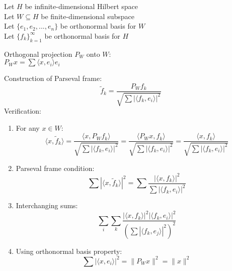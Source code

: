 \documentclass{article}
\begin{document}
Let $H$ be infinite-dimensional Hilbert space\\
Let $W \subseteq H$ be finite-dimensional subspace\\
Let $\{e_1, e_2, ..., e_n \}$ be orthonormal basis for $W$\\
Let $\{f_k \}_{k = 1}^{\infty}$ be orthonormal basis for $H$

Orthogonal projection $P_W$ onto $W$:\\
$P_W x = \sum \langle x, e_i \rangle e_i$

Construction of Parseval frame:
\begin{equation}
  \tilde{f}_k = \frac{P_W f_k}{\sqrt{\sum | \langle f_k, e_i \rangle |^2}}
\end{equation}
Verification:
\begin{enumerate}
  \item For any $x \in W$:
  \begin{equation}
    \langle x, \tilde{f}_k \rangle = \frac{\langle x, P_W f_k
    \rangle}{\sqrt{\sum | \langle f_k, e_i \rangle |^2}} = \frac{\langle P_W
    x, f_k \rangle}{\sqrt{\sum | \langle f_k, e_i \rangle |^2}} =
    \frac{\langle x, f_k \rangle}{\sqrt{\sum | \langle f_k, e_i \rangle |^2}}
  \end{equation}
  \item Parseval frame condition:
  \begin{equation}
    \sum | \langle x, \tilde{f}_k \rangle |^2 = \sum \frac{| \langle x, f_k
    \rangle |^2}{\sum | \langle f_k, e_i \rangle |^2}
  \end{equation}
  \item Interchanging sums:
  \begin{equation}
    \sum_i \sum_k \frac{| \langle x, f_k \rangle |^2 | \langle f_k, e_i
    \rangle |^2}{(\sum | \langle f_k, e_j \rangle |^2)^2}
  \end{equation}
  \item Using orthonormal basis property:
  \begin{equation}
    \sum | \langle x, e_i \rangle |^2 = \|P_W x\|^2 = \|x\|^2
  \end{equation}
\end{enumerate}
\end{document}
